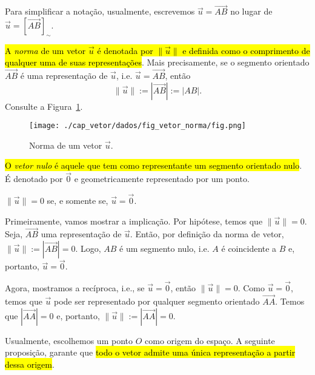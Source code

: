 \begin{obs}
  Para simplificar a notação, usualmente, escrevemos $\vec{u}=\overrightarrow{AB}$ no lugar de $\vec{u} = \left[\overrightarrow{AB}\right]_{\sim}$.
\end{obs}

\hl{A \emph{norma} de um vetor $\vec{u}$ é denotada por $\|\vec{u}\|$ e definida como o comprimento de qualquer uma de suas representações}. Mais precisamente, se o segmento orientado $\overrightarrow{AB}$ é uma representação de $\vec{u}$, i.e. $\vec{u} = \overrightarrow{AB}$, então
\begin{equation}
  \|\vec{u}\| := |\overrightarrow{AB}| := |AB|.
\end{equation}
Consulte a Figura~\ref{cap_vetor_sec_vetor:fig:vetor_norma}.

\begin{figure}[h]
  \centering
  \texttt{[image: ./cap\_vetor/dados/fig\_vetor\_norma/fig.png]}
  \caption{Norma de um vetor $\vec{u}$.}
  \label{cap_vetor_sec_vetor:fig:vetor_norma}
\end{figure}

\hl{O \emph{vetor nulo} é aquele que tem como representante um segmento orientado nulo}. É denotado por $\vec{0}$ e geometricamente representado por um ponto.

\begin{proposicao}
  $\|\vec{u}\| = 0$ se, e somente se, $\vec{u} = \vec{0}$.
\end{proposicao}
\begin{demonstracao}
  Primeiramente, vamos mostrar a implicação. Por hipótese, temos que $\|\vec{u}\| = 0$. Seja, $\overrightarrow{AB}$ uma representação de $\vec{u}$. Então, por definição da norma de vetor, $\|\vec{u}\| := \left|\overrightarrow{AB}\right| = 0$. Logo, $AB$ é um segmento nulo, i.e. $A$ é coincidente a $B$ e, portanto, $\vec{u} = \vec{0}$.

  Agora, mostramos a recíproca, i.e., se $\vec{u} = \vec{0}$, então $\|\vec{u}\| = 0$. Como $\vec{u} = \vec{0}$, temos que $\vec{u}$ pode ser representado por qualquer segmento orientado $\overrightarrow{AA}$. Temos que $\left|\overrightarrow{AA}\right| = 0$ e, portanto, $\|\vec{u}\| := \left|\overrightarrow{AA}\right| = 0$.
\end{demonstracao}

Usualmente, escolhemos um ponto $O$ como origem do espaço. A seguinte proposição, garante que \hl{todo o vetor admite uma única representação a partir dessa origem}.

